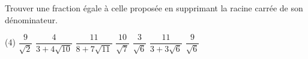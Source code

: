 \documentclass[a4paper,12pt]{report}
\begin{document}
\begin{auto} Trouver une fraction égale à celle proposée en supprimant la racine carrée de son dénominateur.

\begin{tasks}(4)
	\task $\dfrac{ 9 }{\sqrt{2}} $
	\task $\dfrac{ 4 }{3+4\sqrt{10}} $ 
	\task $\dfrac{ 11 }{8+7\sqrt{11}} $ 
	\task $\dfrac{ 10 }{\sqrt{7}} $
	\task $\dfrac{ 3 }{\sqrt{6}} $
	\task $\dfrac{ 11 }{3+3\sqrt{6}} $ 
	\task $\dfrac{ 9 }{\sqrt{6}} $
\end{tasks}

\end{auto}
\begin{comment}
\begin{auto}
Calculer et donner la réponse sous la forme d'un entier ou d'une fraction irréductible ne contenant pas de racines.
	\begin{tasks}(4)
\task $\sqrt{16+9}$
\task $\sqrt{0,49}$
\task $\sqrt{\dfrac{16}{9}}$
\task $\sqrt[3]{27 \cdot 125}$
\task $\sqrt{16 \cdot 9}$
\task $\sqrt{20}+\sqrt{5}$
\task $\dfrac{\sqrt{6}}{\sqrt{216}}$
\task $\sqrt{20} \cdot \sqrt{45}$
\task $\sqrt{1600}$
\task $\sqrt{100-36}$
\task $\dfrac{3 \sqrt{20}}{\sqrt{5}}$
\task $\dfrac{\sqrt{30}}{9 \sqrt{15}}$
	\end{tasks}
\end{auto}
\begin{auto}
Calculer et donner la réponse sous la forme d'un entier ou d'une fraction irréductible ne contenant pas de racines.
	\begin{tasks}(3)
\task $\sqrt{25-16}$
\task $\sqrt[3]{2} \cdot \sqrt[3]{-4}$
\task $\sqrt{2} \cdot \sqrt{8}$
\task $\sqrt[3]{10^6}+0,1^2$
\task $\sqrt{8} \cdot\left(\dfrac{\sqrt{2}}{3}+\dfrac{1}{\sqrt{32}}\right)$
\task $\dfrac{\sqrt{2}}{\sqrt{8}}$
\task $\sqrt[3]{3^4} \cdot \sqrt[3]{3^8}$
\task $\sqrt{\dfrac{16}{81}}+\dfrac{5}{6} \div\left(\dfrac{5}{27} \cdot \sqrt{\dfrac{27}{12}}\right)$
\task $\sqrt{10^2-8^2}$
\task $\sqrt{2} \cdot(\sqrt{2}+\sqrt{8})$
\task*(2) $\left(\sqrt{\dfrac{1}{4}-\dfrac{1}{9}} \cdot \sqrt{\dfrac{4}{5}}\right) \div\left(\sqrt{\dfrac{1}{4}}+\sqrt{\dfrac{1}{9}}\right)$
\end{tasks}
\end{auto}

\begin{auto}{
Extraire les carrés des racines suivantes, c'est-à-dire écrire les racines sous la forme $a\sqrt{b}$ avec $b$ minimal.	
\begin{tasks}(6)
	\task $\sqrt{128}$
	\task $\sqrt{90}$
	\task $\sqrt{300}$
	\task $\sqrt{720}$
	\task $\sqrt{405}$
	\task $\sqrt{810}$
\end{tasks}
}
\end{auto}



\end{comment}
\end{document}
